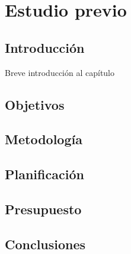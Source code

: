 \chapter{Estudio previo}\label{cap:planificación}

\section{Introducción}
Breve introducción al capítulo

\section{Objetivos}

\section{Metodología}

\section{Planificación}

\section{Presupuesto}

\section{Conclusiones}